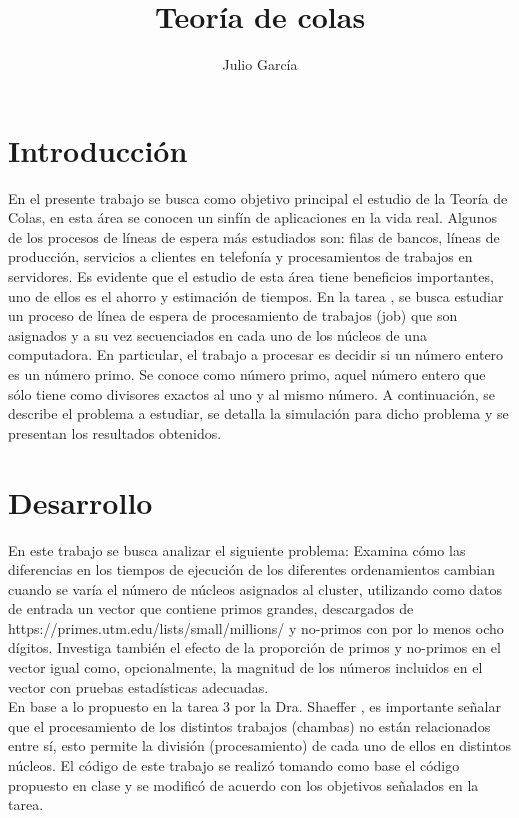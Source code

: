 \documentclass{article}
\title {Teoría de colas}
\author{Julio Garc\'ia}
\begin{document}
\maketitle

\section{Introducción}

En el presente trabajo se busca como objetivo principal el estudio de la Teoría de Colas, en esta área se conocen un sinfín de aplicaciones en la vida real. Algunos de los procesos de líneas de espera más estudiados son:  filas de bancos, líneas de producción, servicios a clientes en telefonía y procesamientos de trabajos en servidores. Es evidente que el estudio de esta área tiene beneficios importantes, uno de ellos es el ahorro y estimación de tiempos. En la tarea \cite{p3}, se busca estudiar un proceso de línea de espera de procesamiento de trabajos (job) que son asignados y a su vez secuenciados en cada uno de los núcleos de una computadora. En particular, el trabajo a procesar es decidir si un número entero es un número primo. Se conoce como número primo, aquel número entero que sólo tiene como divisores exactos al uno y al mismo número. A continuación, se describe el problema a estudiar, se detalla la simulación para dicho problema y se presentan los resultados obtenidos.

\section{Desarrollo}
En este trabajo se busca analizar  el siguiente problema: Examina cómo las diferencias en los tiempos de ejecución de los diferentes ordenamientos cambian cuando se varía el número de núcleos asignados al cluster, utilizando como datos de entrada un vector que contiene primos grandes, descargados de https://primes.utm.edu/lists/small/millions/ y no-primos con por lo menos ocho dígitos. Investiga también el efecto de la proporción de primos y no-primos en el vector igual como, opcionalmente, la magnitud de los números incluidos en el vector con pruebas estadísticas adecuadas.\\
En base a lo propuesto en la tarea 3 por la Dra. Shaeffer \cite{p3}, es importante señalar que el procesamiento de los distintos trabajos (chambas) no están relacionados entre sí, esto permite la división (procesamiento) de cada uno de ellos en distintos núcleos. El código de este trabajo se realizó tomando como base el código propuesto en clase y se modificó de acuerdo con los objetivos señalados en la tarea.   
\end{document}
